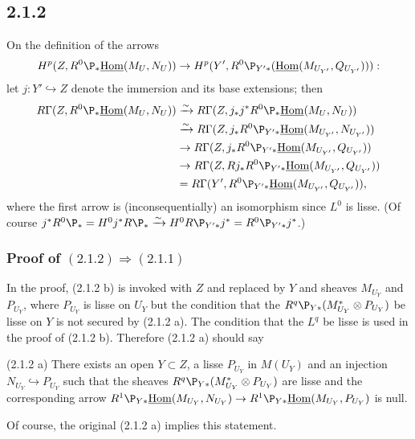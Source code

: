 \documentclass[deligne.tex]{subfiles}
\begin{document}
\subsection*{2.1.2} On the definition of the arrows
\begin{equation*}
	H^p(Z,R^0\P_*\underline\Hom(M_U,N_U))
	\ra H^p(Y',R^0\P_{Y'*}(\underline\Hom(M_{U_{Y'}},Q_{U_{Y'}}))):
\end{equation*}
let $j:Y'\hookrightarrow Z$ denote the immersion and its base extensions; 
then
\begin{align*}
	R\Gamma(Z,R^0\P_*\underline\Hom(M_U,N_U))
	&\xra\sim R\Gamma(Z,j_*j^*R^0\P_*\underline\Hom(M_U,N_U)) \\
	&\xra\sim R\Gamma(Z,j_*R^0\P_{Y'*}\underline\Hom(M_{U_{Y'}},N_{U_{Y'}})) \\
	&\ra R\Gamma(Z,j_*R^0\P_{Y'*}\underline\Hom(M_{U_{Y'}},Q_{U_{Y'}})) \\
	&\ra R\Gamma(Z,Rj_*R^0\P_{Y'*}\underline\Hom(M_{U_{Y'}},Q_{U_{Y'}})) \\
	&=R\Gamma(Y',R^0\P_{Y'*}\underline\Hom(M_{U_{Y'}},Q_{U_{Y'}})),
\end{align*}
where the first arrow is (inconsequentially) an isomorphism since $L^0$ is lisse.
(Of course $j^*R^0\P_*=H^0j^*R\P_*\xra\sim H^0R\P_{Y'*}j^*=R^0\P_{Y'*}j^*$.)

\subsubsection*{Proof of $(2.1.2)\Rightarrow(2.1.1)$}
In the proof, (2.1.2 b) is invoked with
$Z$ and replaced by $Y$ and sheaves $M_{U_Y}$ and $P_{U_Y}$, where $P_{U_Y}$
is lisse on $U_Y$ but the condition that the
$R^q\P_{Y*}(M_{U_Y}^*\otimes P_{U_Y})$ be lisse on $Y$ is not secured
by (2.1.2 a). The condition that the $L^q$ be lisse is used in the proof of
(2.1.2 b). Therefore (2.1.2 a) should say

(2.1.2 a) There exists an open $Y\subset Z$, a lisse $P_{U_Y}$ in $M(U_Y)$
and an injection $N_{U_Y}\hookrightarrow P_{U_Y}$ such that the sheaves
$R^q\P_{Y*}(M_{U_Y}^*\otimes P_{U_Y})$ are lisse and the corresponding arrow
$R^1\P_{Y*}\underline\Hom(M_{U_Y},N_{U_Y})\rightarrow R^1\P_{Y*}\underline\Hom(M_{U_Y},P_{U_Y})$ is null.

Of course, the original (2.1.2 a) implies this statement.
\end{document}
